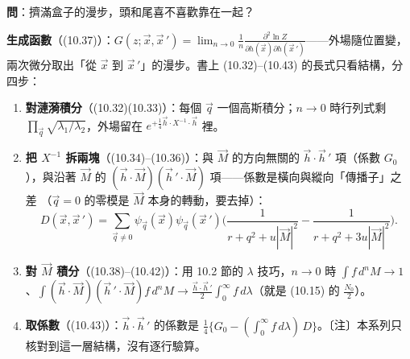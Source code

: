 \textbf{問}：擠滿盒子的漫步，頭和尾喜不喜歡靠在一起？

\textbf{生成函數}（(10.37)）：$G(z;\vec x,\vec x\,')=\lim_{n\to0}\frac1n\frac{\partial^2\ln Z}{\partial h(\vec x)\partial h(\vec x\,')}$——外場隨位置變，兩次微分取出「從 $\vec x$ 到 $\vec x\,'$」的漫步。書上 (10.32)--(10.43) 的長式只看結構，分四步：
\begin{enumerate}[label=\textbf{\arabic*.},itemsep=0em,leftmargin=1.6em]
\item \textbf{對漣漪積分}（(10.32)(10.33)）：每個 $\vec q$ 一個高斯積分；$n\to0$ 時行列式剩 $\prod_{\vec q}\sqrt{\lambda_1/\lambda_2}$，外場留在 $e^{+\frac14\vec h\cdot X^{-1}\cdot\vec h}$ 裡。
\item \textbf{把 $X^{-1}$ 拆兩塊}（(10.34)--(10.36)）：與 $\vec M$ 的方向無關的 $\vec h\cdot\vec h\,'$ 項（係數 $G_0$），與沿著 $\vec M$ 的 $(\vec h\cdot\vec M)(\vec h\,'\cdot\vec M)$ 項——係數是橫向與縱向「傳播子」之差
（$\vec q=0$ 的零模是 $\vec M$ 本身的轉動，要去掉）：
\[D(\vec x,\vec x\,')=\sum_{\vec q\ne0}\psi_{\vec q}(\vec x)\psi_{\vec q}(\vec x\,')\Big(\frac1{r+q^2+u|\vec M|^2}-\frac1{r+q^2+3u|\vec M|^2}\Big).\tag{10.36}\]
\item \textbf{對 $\vec M$ 積分}（(10.38)--(10.42)）：用 10.2 節的 $\lambda$ 技巧，$n\to0$ 時 $\int f\,d^nM\to1$、$\int(\vec h\cdot\vec M)(\vec h\,'\cdot\vec M)f\,d^nM\to\frac{\vec h\cdot\vec h\,'}2\int_0^\infty f\,d\lambda$（就是 (10.15) 的 $\frac{N_0}2$）。
\item \textbf{取係數}（(10.43)）：$\vec h\cdot\vec h\,'$ 的係數是 $\frac14\{G_0-(\int_0^\infty f\,d\lambda)\,D\}$。〔注〕本系列只核對到這一層結構，沒有逐行驗算。
\end{enumerate}

